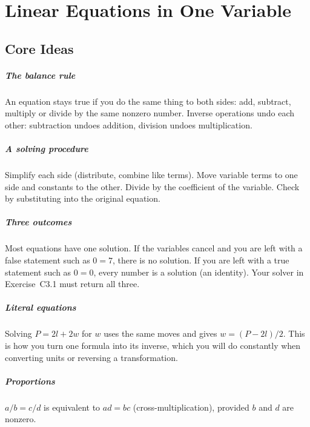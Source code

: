 \chapter{Linear Equations in One Variable}


\section{Core Ideas}

\paragraph{The balance rule} An equation stays true if you do the same thing to both sides: add, subtract, multiply or divide by the same nonzero number. Inverse operations undo each other: subtraction undoes addition, division undoes multiplication.

\paragraph{A solving procedure} Simplify each side (distribute, combine like terms). Move variable terms to one side and constants to the other. Divide by the coefficient of the variable. Check by substituting into the original equation.

\paragraph{Three outcomes} Most equations have one solution. If the variables cancel and you are left with a false statement such as $0 = 7$, there is no solution. If you are left with a true statement such as $0 = 0$, every number is a solution (an identity). Your solver in Exercise~C3.1 must return all three.

\paragraph{Literal equations} Solving $P = 2l + 2w$ for $w$ uses the same moves and gives $w = (P - 2l)/2$. This is how you turn one formula into its inverse, which you will do constantly when converting units or reversing a transformation.

\paragraph{Proportions} $a/b = c/d$ is equivalent to $ad = bc$ (cross-multiplication), provided $b$ and $d$ are nonzero.

